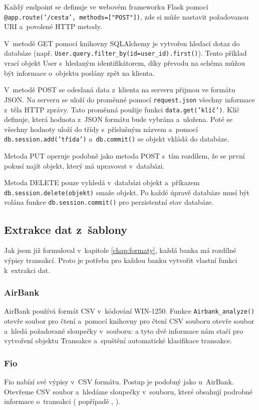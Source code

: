 Každý endpoint se definuje ve webovém frameworku Flask pomocí \break \texttt{@app.route('/cesta', methods=["POST"])}, zde si může nastavit požadovanou URI a~povolené HTTP metody.

V~metodě GET pomocí knihovny SQLAlchemy je vytvořen hledací dotaz do databáze \break (např. \texttt{User.query.filter\_by(id=user\_id).first()}). Tento příklad vrací objekt User s~hledaným identifikátorem, díky převodu na schéma můžou být informace o~objektu poslány zpět na klienta.

V~metodě POST se odeslaná data z~klienta na serveru přijmou ve formátu JSON. Na serveru se uloží do proměnné pomocí \texttt{request.json} všechny informace z~těla HTTP zprávy. Tato proměnná použije funkci \texttt{data.get('klíč')}. Klíč definuje, která hodnota z~JSON formátu bude vybrána a~uložena. Poté se všechny hodnoty uloží do třídy s~příslušným názvem a~pomocí \texttt{db.session.add('třída')} a~\texttt{db.commit()} se objekt vkládá do databáze.

Metoda PUT operuje podobně jako metoda POST s~tím rozdílem, že se první pokusí najít objekt, který má upravovat v~databázi.

Metoda DELETE pouze vyhledá v~databázi objekt a~příkazem \break \texttt{db.session.delete(objekt)} smaže objekt.
Po každé úpravě databáze musí být volána funkce \texttt{db.session.commit()} pro perzistentní stav databáze.


\subsection{Extrakce dat z~šablony}
Jak jsem již formuloval v~kapitole \ref{chap:formaty}, každá banka má rozdílné výpisy transakcí. Proto je potřeba pro každou banku vytvořit vlastní funkci k~extrakci dat.
\subsubsection{AirBank}
AirBank používá formát CSV v~kódování WIN-1250. Funkce \texttt{Airbank\_analyze()} otevře soubor pro čtení a~pomocí knihovny pro čtení CSV souboru otevře soubor a~hledá požadované sloupečky v~souboru:  a  tyto dvě informace nám stačí pro vytvoření objektu Transakce a~spuštění automatické klasifikace transakce.

\subsubsection{Fio}
Fio nabízí své výpisy v~CSV formátu. Postup je podobný jako u~AirBank. Otevřeme CSV soubor a~hledáme sloupečky v~souboru, které obsahují podrobné informace o~transakci ( popřípadě , ).

